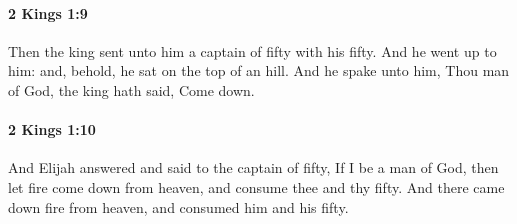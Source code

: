		\paragraph{2 Kings 1:9} %
			\label{2KINGS-1-9}

			Then the king sent unto him a captain of fifty with his fifty. And he went up to him: and, behold, he sat on the top of an hill. And he spake unto him, Thou man of God, the king hath said, Come down.


		\paragraph{2 Kings 1:10} %
			\label{2KINGS-1-10}

			And Elijah answered and said to the captain of fifty, If I be a man of God, then let fire come down from heaven, and consume thee and thy fifty. And there came down fire from heaven, and consumed him and his fifty.

